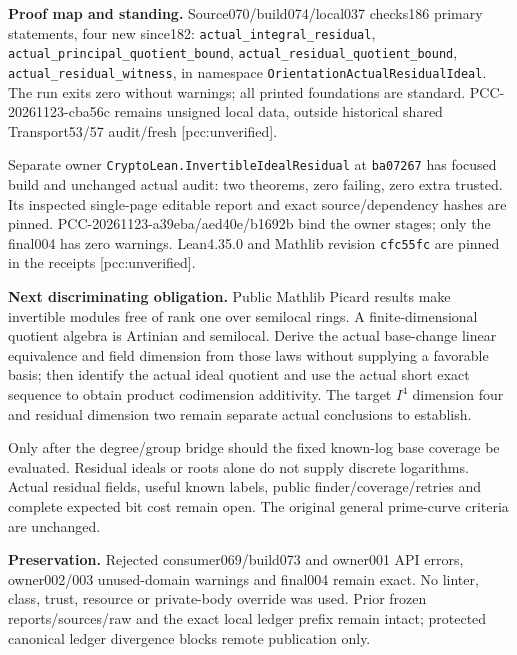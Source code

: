 \documentclass[11pt]{article}
\begin{document}
\textbf{Proof map and standing.}
Source070/build074/local037 checks186 primary statements, four new since182:
\texttt{actual\_\allowbreak{}integral\_\allowbreak{}residual},
\texttt{actual\_\allowbreak{}principal\_\allowbreak{}quotient\_\allowbreak{}bound},
\texttt{actual\_\allowbreak{}residual\_\allowbreak{}quotient\_\allowbreak{}bound},
\texttt{actual\_\allowbreak{}residual\_\allowbreak{}witness},
in namespace \texttt{OrientationActualResidualIdeal}.
The run exits zero without warnings; all printed foundations are standard.
PCC-20261123-cba56c remains unsigned local data, outside historical shared
Transport53/57 audit/fresh [pcc:unverified].

Separate owner \texttt{CryptoLean.InvertibleIdealResidual} at
\texttt{ba07267} has focused build and unchanged actual audit:
two theorems, zero failing, zero extra trusted.
Its inspected single-page editable report and exact source/dependency hashes
are pinned. PCC-20261123-a39eba/aed40e/b1692b bind the owner stages;
only the final004 has zero warnings. Lean4.35.0 and Mathlib revision
\texttt{cfc55fc} are pinned in the receipts [pcc:unverified].

\textbf{Next discriminating obligation.}
Public Mathlib Picard results make invertible modules free of rank one over
semilocal rings. A finite-dimensional quotient algebra is Artinian and
semilocal. Derive the actual base-change linear equivalence and field dimension
from those laws without supplying a favorable basis; then identify the actual
ideal quotient and use the actual short exact sequence to obtain product
codimension additivity. The target \(I^4\) dimension four and residual dimension
two remain separate actual conclusions to establish.

Only after the degree/group bridge should the fixed known-log base coverage
be evaluated. Residual ideals or roots alone do not supply discrete logarithms.
Actual residual fields, useful known labels, public finder/coverage/retries and
complete expected bit cost remain open. The original general prime-curve
criteria are unchanged.

\textbf{Preservation.}
Rejected consumer069/build073 and owner001 API errors, owner002/003
unused-domain warnings and final004 remain exact. No linter, class, trust,
resource or private-body override was used. Prior frozen reports/sources/raw
and the exact local ledger prefix remain intact; protected canonical ledger
divergence blocks remote publication only.
\end{document}
